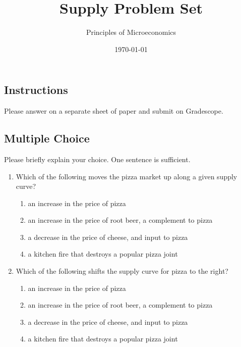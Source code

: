 \documentclass{article}
\title{Supply Problem Set}
\author{Principles of Microeconomics}
\date{\today}
\begin{document}
\maketitle

\subsection*{Instructions} Please answer on a separate sheet of paper and submit on Gradescope. 

\subsection*{Multiple Choice} Please briefly explain your choice. One sentence is sufficient.

\begin{enumerate}

\item Which of the following moves the pizza market up along a given supply curve?

	\begin{enumerate}
	
	\item an increase in the price of pizza
	
	\item an increase in the price of root beer, a complement to pizza
	
	\item a decrease in the price of cheese, and input to pizza
	
	\item a kitchen fire that destroys a popular pizza joint
	
	\end{enumerate} 
	
\item Which of the following shifts the supply curve for pizza to the right?

	\begin{enumerate}
	
	\item an increase in the price of pizza
	
	\item an increase in the price of root beer, a complement to pizza
	
	\item a decrease in the price of cheese, and input to pizza
	
	\item a kitchen fire that destroys a popular pizza joint
	

\end{enumerate}
\end{enumerate}
\end{document}
